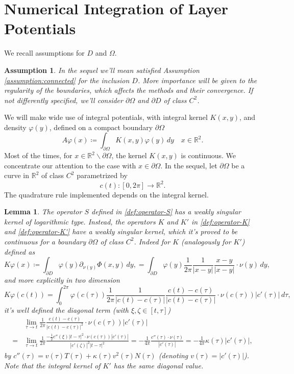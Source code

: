 \documentclass[10pt, a4paper, twoside, openright]{book}
\theoremstyle{definition}
\theoremstyle{plain}
\theoremstyle{plain}
\theoremstyle{plain}
\theoremstyle{plain}
\theoremstyle{plain}
\newtheorem{lemma}[subsection]{Lemma}
\theoremstyle{plain}
\theoremstyle{plain}
\newtheorem{assumption}[subsection]{Assumption}
\theoremstyle{plain}
\let\phi\varphi
\begin{document}
\section{Numerical Integration of Layer Potentials}
We recall assumptions for $D$ and $\Omega$.     
\begin{assumption}
 In the sequel we'll mean satisfied Assumption \ref{assumption:connected} for the inclusion $D$. 
 More importance will be given to the regularity of the boundaries, 
 which affects the methods and their convergence. If not differently specified, we'll consider $\partial \Omega$ and $\partial D$ of class $C^2$.
\end{assumption}
We will make wide use of integral potentials, with integral kernel $K(x,y)$, and density $\phi(y)$, defined on a compact boundary $\partial \Omega$
\begin{equation}
\label{eq:quad-def-operator}
 A\phi(x)\coloneqq \int_{\partial \Omega} K(x,y)\phi(y)\,dy \quad x\in\mathbb{R}^2.
\end{equation}
Most of the times, for $x\in\mathbb{R}^2\backslash\partial \Omega$, the kernel $K(x,y)$ is 
continuous. We concentrate our 
attention to the case with $x\in\partial\Omega$.
In the sequel, let $\partial\Omega$ be a curve in $\mathbb{R}^2$ of class $C^2$ parametrized by
\begin{equation}
c(t):[0,2\pi]\to\mathbb{R}^2.
\end{equation}
The quadrature rule implemented depends on the integral kernel. 
\begin{lemma}
The operator $S$ defined in \eqref{def:operator-S} has a weakly singular kernel of logarithmic type. 
Instead, the operators $K$ and $K'$ in 
\eqref{def:operator-K} and \eqref{def:operator-K'} have a weakly singular kernel, which it's proved to 
be continuous for a boundary $\partial \Omega$ of class $C^2$. Indeed for $K$ (analogously for $K'$) defined as
\begin{equation*}
K\phi(x)\coloneqq\int_{\partial D} \phi(y) \partial_{\nu(y)} \Phi(x, y) \,dy,
=\int_{\partial D} \phi(y)\frac{1}{2\pi}\frac{1}{|x - y|}\frac{x-y}{|x-y|}\cdot\nu(y)\, dy,
\end{equation*}
and more explicitly in two dimension
\begin{equation}
K\phi(c(t)) =\int_0^{2\pi} \phi(c(\tau))\frac{1}{2\pi}\frac{1}{|c(t) - c(\tau)|}\frac{c(t)-c(\tau)}{|c(t) - c(\tau)|}\cdot\nu(c(\tau))|c'(\tau)|\, d\tau,
\end{equation}
it's well defined the diagonal term (with $\xi,\zeta \in [t,\tau]$)
\begin{align}
 &\lim_{\tau \to t}\frac{1}{2\pi}\frac{c(t)-c(\tau)}{|c(t) - c(\tau)|^2}\cdot\nu(c(\tau))|c'(\tau)| \\
 =&\lim_{\tau \to t}\frac{1}{2\pi}\frac{-\frac{1}{2}c''(\xi)|t-\tau|^2\cdot\nu(c(\tau))|c'(\tau)|}{|c'(\zeta)|^2|t-\tau|^2}
 = -\frac{1}{4\pi}\frac{c''(\tau)\cdot\nu(\tau)}{|c'(\tau)|} = -\frac{1}{4\pi}\kappa(\tau)|c'(\tau)|,
\end{align}
by $c''(\tau)=v(\tau)T(\tau) + \kappa(\tau)v^2(\tau)N(\tau)$ (denoting $v(\tau)=|c'(\tau)|$). Note that the integral kernel of $K'$ has the same diagonal value.
\end{lemma}
\end{document}

